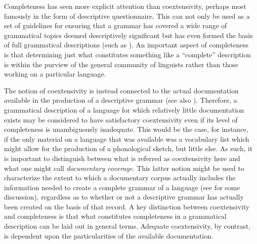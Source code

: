 Completeness has seen more explicit attention than coextensivity, perhaps most
famously in the form of  descriptive questionnaire.
This can not only be used as a set of guidelines for ensuring that a grammar has
covered a wide range of grammatical topics deemed descriptively significant
\citep[360]{Noonan:2006} but has even formed the basis of full grammatical
descriptions (such as ). An important aspect of
completeness is that determining just what constitutes something like a
``complete'' description is within the purview of the general community of
linguists rather than those working on a particular language.

The notion of coextensivity is instead connected to the actual documentation
available in the production of a descriptive grammar (see also \citet{Moseltv}). Therefore, a grammatical
description of a language for which relatively little documentation exists may
be considered to have satisfactory coextensivity even if its level of
completeness is unambiguously inadequate. This would be the case, for instance,
if the only material on a language that was available was a vocabulary list
which might allow for the production of a phonological sketch, but little else.
As such, it is important to distinguish between what is referred as
coextensivity here and what one might call \emph{documentary coverage}. This
latter notion might be used to characterize the extent to which a documentary
corpus actually includes the information needed to create a complete grammar of
a language (see  for some discussion), regardless as to
whether or not a descriptive grammar has actually been created on the basis of
that record. A key distinction between coextensivity and completeness is that
what constitutes completeness in a grammatical description can be laid out in
general terms. Adequate coextensivity, by contrast, is dependent upon the
particularities of the available documentation.

